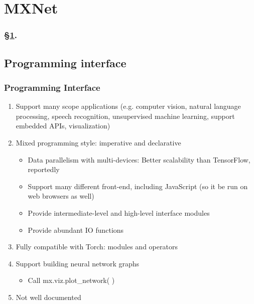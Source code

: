 
\section{MXNet}\label{sec:MxNet}


\frameinlbffalse

{

\begin{frame}[plain]
\frametitle{\S\ref{sec:MxNet}. \insertsection}
\listofframes
\end{frame}
\addtocounter{framenumber}{-1} %

}

\frameinlbftrue

\subsection{Programming interface}

\begin{frame}
  \MyLogo
  \frametitle{Programming Interface}  

\begin{enumerate}
%
\item Support many scope applications (e.g. computer vision, natural language processing,  speech recognition, unsupervised machine learning, support embedded APIs, visualization)
%
\item Mixed programming style: imperative and declarative
\begin{itemize}
\item Data parallelism with multi-devices: Better scalability than TensorFlow, reportedly
\item Support many different front-end, including JavaScript (so it be run on web browsers as well)
\item Provide intermediate-level and high-level interface modules
\item Provide abundant IO functions 
%
\end{itemize}
%
\item Fully compatible with Torch: modules and operators
%
\item Support building neural network graphs
\begin{itemize}
\item Call mx.viz.plot\_network( )
\end{itemize}
%
\item Not well documented
%
\end{enumerate}

\end{frame}

